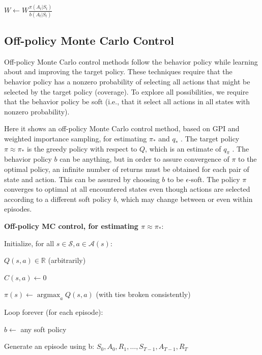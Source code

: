 \documentclass{article}
\begin{document}
\hspace{1cm} $W \leftarrow W \frac { \pi ( A _ { t } | S _ { t } ) } { b ( A _ { t } | S _ { t } ) }$

\subsection{Off-policy Monte Carlo Control}

Off-policy Monte Carlo control methods follow the behavior policy while learning about and improving the target policy. These techniques require that the behavior policy 
has a nonzero probability of selecting all actions that might be selected by the target policy (coverage). To explore all possibilities, 
we require that the behavior policy be soft (i.e., that it select all actions in all states with nonzero probability).

Here it shows an off-policy Monte Carlo control method, based on GPI and weighted importance sampling, 
for estimating $\pi _ { * }$ and $q _ { * }$ . The target policy $\pi \approx \pi _ { * }$ is the greedy policy with respect to $Q$, 
which is an estimate of $q _ { \pi }$ . The behavior policy $b$ can be anything, but in order to assure convergence of $\pi$ to the optimal policy, 
an infinite number of returns must be obtained for each pair of state and action. This can be assured by choosing $b$ to be $\epsilon$-soft. 
The policy $\pi$ converges to optimal at all encountered states even though actions are selected according to a different soft policy $b$, 
which may change between or even within episodes.

\textbf{Off-policy MC control, for estimating $ \pi \approx \pi_{*} $}:

Initialize, for all $s \in \mathcal { S } ,   a \in \mathcal { A } ( s )$:

\hspace{.5cm} $Q ( s , a ) \in \mathbb { R }$ (arbitrarily)

\hspace{.5cm} $C ( s , a ) \gets 0$

\hspace{.5cm} $\pi ( s ) \gets \operatorname { a r g   m a x } _ { a } Q ( s , a )$ (with ties broken consistently)

Loop forever (for each episode):

\hspace{.5cm} $b \leftarrow$ any soft policy

\hspace{.5cm} Generate an episode using b: $S _ { 0 } , A _ { 0 } , R _ { 1 } , \ldots , S _ { T - 1 } , A _ { T - 1 } , R _ { T }$
\end{document}
